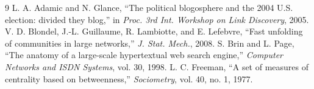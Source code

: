 \documentclass[10pt,conference]{IEEEtran}
\begin{document}
\begin{thebibliography}{9}
 L. A. Adamic and N. Glance, ``The political blogosphere and the 2004 U.S.
election: divided they blog,'' in \emph{Proc. 3rd Int. Workshop on Link Discovery}, 2005.
 V. D. Blondel, J.-L. Guillaume, R. Lambiotte, and E. Lefebvre, ``Fast unfolding
of communities in large networks,'' \emph{J. Stat. Mech.}, 2008.
 S. Brin and L. Page, ``The anatomy of a large-scale hypertextual web search
engine,'' \emph{Computer Networks and ISDN Systems}, vol. 30, 1998.
 L. C. Freeman, ``A set of measures of centrality based on betweenness,''
\emph{Sociometry}, vol. 40, no. 1, 1977.
\end{thebibliography}
\end{document}
